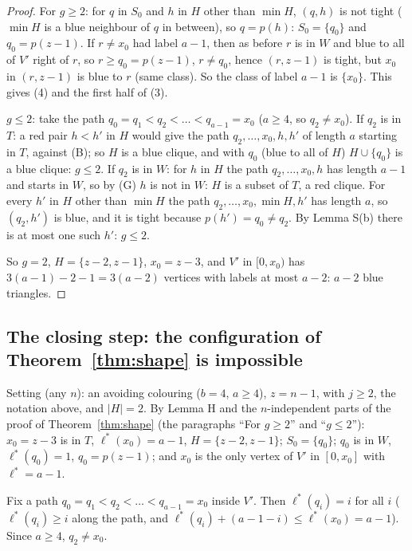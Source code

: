 \documentclass[11pt]{article}
\theoremstyle{plain}
\theoremstyle{remark}
\begin{document}
\begin{proof}
For $g \geq 2$: for $q$ in $S_0$ and $h$ in $H$ other than $\min H$, $(q, h)$ is not tight ($\min H$ is a blue
neighbour of $q$ in between), so $q = p(h)$: $S_0 = \{q_0\}$ and $q_0 = p(z-1)$. If $r \neq x_0$ had label $a-1$,
then as before $r$ is in $W$ and blue to all of $V'$ right of $r$, so $r \geq q_0 = p(z-1)$, $r \neq q_0$, hence
$(r, z-1)$ is tight, but $x_0$ in $(r, z-1)$ is blue to $r$ (same class). So the class of label $a-1$ is
$\{x_0\}$. This gives (4) and the first half of (3).

$g \leq 2$: take the path $q_0 = q_1 < q_2 < \dots < q_{a-1} = x_0$ ($a \geq 4$, so $q_2 \neq x_0$). If $q_2$ is in
$T$: a red pair $h < h'$ in $H$ would give the path $q_2, \dots, x_0, h, h'$ of length $a$ starting in $T$,
against (B); so $H$ is a blue clique, and with $q_0$ (blue to all of $H$) $H \cup \{q_0\}$ is a blue clique:
$g \leq 2$. If $q_2$ is in $W$: for $h$ in $H$ the path $q_2, \dots, x_0, h$ has length $a-1$ and starts in $W$, so
by (G) $h$ is not in $W$: $H$ is a subset of $T$, a red clique. For every $h'$ in $H$ other than $\min H$ the path
$q_2, \dots, x_0, \min H, h'$ has length $a$, so $(q_2, h')$ is blue, and it is tight because
$p(h') = q_0 \neq q_2$. By Lemma S(b) there is at most one such $h'$: $g \leq 2$.

So $g = 2$, $H = \{z-2, z-1\}$, $x_0 = z-3$, and $V'$ in $[0, x_0)$ has $3(a-1) - 2 - 1 = 3(a-2)$ vertices with
labels at most $a-2$: $a-2$ blue triangles.
\end{proof}

\subsection{The closing step: the configuration of Theorem~\ref{thm:shape} is impossible}

Setting (any $n$): an avoiding colouring ($b = 4$, $a \geq 4$), $z = n-1$, with $j \geq 2$, the notation above, and
$|H| = 2$. By Lemma H and the $n$-independent parts of the proof of Theorem~\ref{thm:shape} (the paragraphs
``For $g \geq 2$'' and ``$g \leq 2$''): $x_0 = z-3$ is in $T$, $\ell^*(x_0) = a-1$, $H = \{z-2, z-1\}$;
$S_0 = \{q_0\}$; $q_0$ is in $W$, $\ell^*(q_0) = 1$, $q_0 = p(z-1)$; and $x_0$ is the only vertex of $V'$ in
$[0, x_0]$ with $\ell^* = a-1$.

Fix a path $q_0 = q_1 < q_2 < \dots < q_{a-1} = x_0$ inside $V'$. Then $\ell^*(q_i) = i$ for all $i$
($\ell^*(q_i) \geq i$ along the path, and $\ell^*(q_i) + (a-1-i) \leq \ell^*(x_0) = a-1$). Since $a \geq 4$,
$q_2 \neq x_0$.
\end{document}
